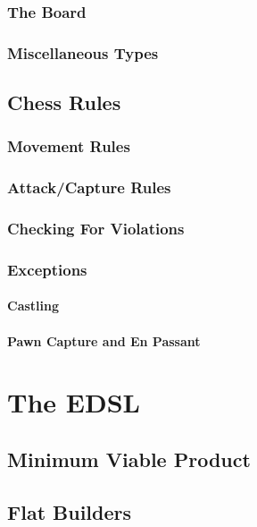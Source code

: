 \documentclass[12pt, a4paper, bibliography=totocnumbered]{scrreprt}
\begin{document}
\subsection{The Board}

\subsection{Miscellaneous Types}

\section{Chess Rules}

\subsection{Movement Rules}

\subsection{Attack/Capture Rules}

\subsection{Checking For Violations}

\subsection{Exceptions}

\subsubsection{Castling}

\subsubsection{Pawn Capture and En Passant}

\chapter{The EDSL}

\section{Minimum Viable Product}

\section{Flat Builders}
\end{document}
